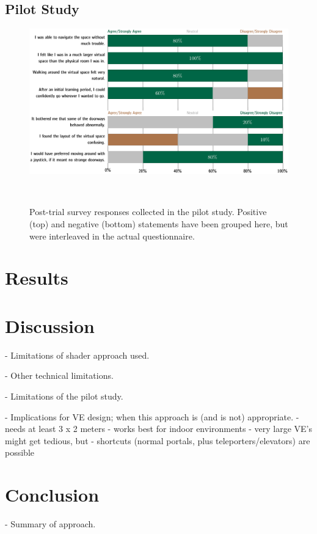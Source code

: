 \documentclass{sigchi}
\begin{document}
\subsection{Pilot Study}

\begin{figure}[htb]
  \centering
  \includegraphics[width=1.75\columnwidth]{figures/LikertChart.pdf}
  \caption{Post-trial survey responses collected in the pilot study.  Positive (top) and negative (bottom) statements have been grouped here, but were interleaved in the actual questionnaire.}~\label{fig:likertChart}
\end{figure}


\section{Results}

\section{Discussion}

- Limitations of shader approach used.

- Other technical limitations.

- Limitations of the pilot study.

- Implications for VE design; when this approach is (and is not) appropriate.
	- needs at least 3 x 2 meters
	- works best for indoor environments
	- very large VE's might get tedious, but
	- shortcuts (normal portals, plus teleporters/elevators) are possible

\section{Conclusion}

- Summary of approach.
\end{document}

